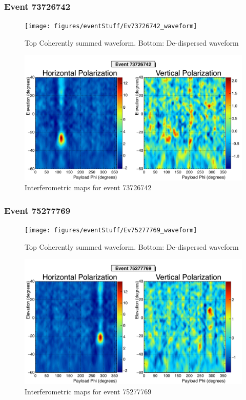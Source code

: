 		\subsubsection{Event 73726742}
		\begin{figure}
		\centering
			\texttt{[image: figures/eventStuff/Ev73726742\_waveform]}
			\caption{Top Coherently summed waveform.  Bottom: De-dispersed waveform} 
		\label{fig:Ev73726742_waveform}
		\end{figure}
		
		\begin{figure}
		\centering
			\includegraphics[width=\textwidth]{figures/intMap/intMap_ev73726742}
			\caption{Interferometric maps for event 73726742} 
		\label{fig:Ev73726742_map}
		\end{figure}			
	
		\subsubsection{Event 75277769}
		\begin{figure}
		\centering
			\texttt{[image: figures/eventStuff/Ev75277769\_waveform]}
			\caption{Top Coherently summed waveform.  Bottom: De-dispersed waveform} 
		\label{fig:Ev75277769_waveform}
		\end{figure}
		
		\begin{figure}
		\centering
			\includegraphics[width=\textwidth]{figures/intMap/intMap_ev75277769}
			\caption{Interferometric maps for event 75277769} 
		\label{fig:Ev75277769_map}
		\end{figure}			
	
